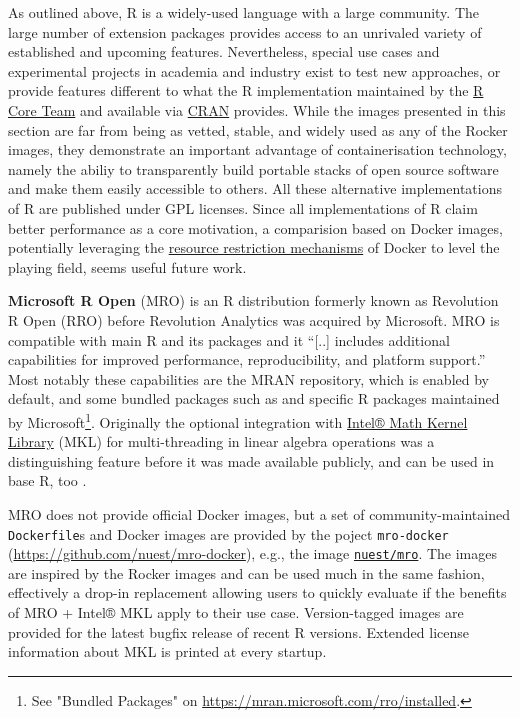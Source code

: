 As outlined above, R is a widely-used language with a large community.
The large number of extension packages provides access to an unrivaled
variety of established and upcoming features. Nevertheless, special use
cases and experimental projects in academia and industry exist to test
new approaches, or provide features different to what the R
implementation maintained by the
\href{https://www.r-project.org/contributors.html}{R Core Team} and
available via \href{https://cran.r-project.org/}{CRAN} provides. While
the images presented in this section are far from being as vetted,
stable, and widely used as any of the Rocker images, they demonstrate an
important advantage of containerisation technology, namely the abiliy to
transparently build portable stacks of open source software and make
them easily accessible to others. All these alternative implementations
of R are published under GPL licenses. Since all implementations of R
claim better performance as a core motivation, a comparision based on
Docker images, potentially leveraging the
\href{https://docs.docker.com/config/containers/resource_constraints/}{resource
restriction mechanisms} of Docker to level the playing field, seems
useful future work.

\textbf{Microsoft R Open} (MRO) is an R distribution formerly known as
Revolution R Open (RRO) before Revolution Analytics was acquired by
Microsoft. MRO is compatible with main R and its packages and it
``{[}..{]} includes additional capabilities for improved performance,
reproducibility, and platform support.'' \citep{microsoft_mro} Most
notably these capabilities are the MRAN repository, which is enabled by
default, and some bundled packages such as  and
specific R packages maintained by
Microsoft\footnote{See "Bundled Packages" on \href{https://mran.microsoft.com/rro/installed}{https://mran.microsoft.com/rro/installed}.}.
Originally the optional integration with
\href{https://software.intel.com/en-us/mkl}{Intel® Math Kernel Library}
(MKL) for multi-threading in linear algebra operations
\citep{microsoft_multithread} was a distinguishing feature before it was
made available publicly, and can be used in base R, too
\citep{eddelbuettel_thinking_2018}.

MRO does not provide official Docker images, but a set of
community-maintained \texttt{Dockerfile}s and Docker images are provided
by the poject \texttt{mro-docker}
(\url{https://github.com/nuest/mro-docker}), e.g., the image
\href{https://hub.docker.com/repository/docker/nuest/mro/}{\texttt{nuest/mro}}.
The images are inspired by the Rocker images and can be used much in the
same fashion, effectively a drop-in replacement allowing users to
quickly evaluate if the benefits of MRO + Intel® MKL apply to their use
case. Version-tagged images are provided for the latest bugfix release
of recent R versions. Extended license information about MKL is printed
at every startup.

